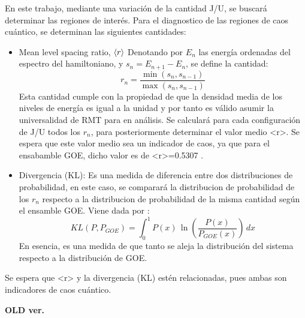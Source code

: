 \documentclass[spanish,titlepage,table]{practicas}
\begin{document}
En este trabajo, mediante una variación de la cantidad J/U, se buscará determinar las regiones de interés.
\newline 
Para el diagnostico de las regiones de caos cuántico, se determinan las siguientes cantidades:
\begin{itemize}
    \item Mean level spacing ratio, $\ev{r}$
Denotando por $E_n$ las energía ordenadas del espectro del hamiltoniano, y
    $s_n=E_{n+1}-E_{n}$, se define la cantidad:
		\begin{equation}
			r_n=\frac{\min(s_n,s_{n-1})}{\max(s_n,s_{n-1})}
		\end{equation}
    Esta cantidad cumple con la propiedad de que la densidad media de los niveles de energía es igual a la unidad
    y por tanto es válido asumir la universalidad de RMT para en análisis.
    Se calculará para cada configuración de J/U todos los $r_n$, para posteriormente determinar el valor medio <r>.
    Se espera que este valor medio sea un indicador de caos, ya que para el ensabamble GOE, dicho valor es de <r>=0.5307 \cite{Atas_2013}.
    \item Divergencia (KL): Es una medida de diferencia entre dos distribuciones de probabilidad, en este caso, se comparará la distribucion de probabilidad de los $r_n$ 
    respecto a la distribucion de probabilidad de la misma cantidad según el ensamble GOE. Viene dada por \cite{Pausch2022}:
    \[
KL(P,P_{GOE}) = \int_{0}^{1} P(x) \, \ln \left( \frac{P(x)}{P_{GOE}(x)} \right) \, dx
\]
    En esencia, es una medida de que tanto se aleja la distribución del sistema respecto a la distribución de GOE.   
\end{itemize}
Se espera que <r> y la divergencia (KL) estén relacionadas, pues ambas son indicadores de caos cuántico. 
\newline


\textbf{OLD ver.} \newline 
{}
\end{document}
